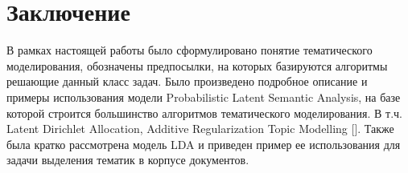 \documentclass[aps,%
12pt,%
final,%
oneside,
onecolumn,%
musixtex, %
superscriptaddress,%
centertags]{article} %
\begin{document}
\newpage
\section*{Заключение}
\hspace{0.4cm}
В рамках настоящей работы было сформулировано понятие тематического моделирования, обозначены предпосылки, на которых базируются алгоритмы решающие данный класс задач. Было произведено подробное описание и примеры использования модели Probabilistic Latent Semantic Analysis, на базе которой строится большинство алгоритмов тематического моделирования. В т.ч. Latent Dirichlet Allocation, Additive Regularization Topic Modelling [\cite{vorontsov1}]. Также была кратко рассмотрена модель LDA и приведен пример ее использования для задачи выделения тематик в корпусе документов.



\end{document}
